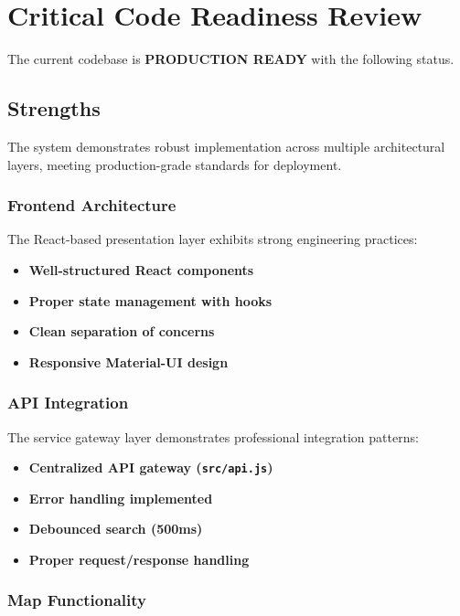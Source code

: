 \chapter{Critical Code Readiness Review}

The current codebase is \textbf{PRODUCTION READY} with the following status.

\section{Strengths}

The system demonstrates robust implementation across multiple architectural layers, meeting production-grade standards for deployment.

\subsection{Frontend Architecture}

The React-based presentation layer exhibits strong engineering practices:

\begin{itemize}
    \item \textbf{Well-structured React components} 
    \item \textbf{Proper state management with hooks} 
    \item \textbf{Clean separation of concerns} 
    \item \textbf{Responsive Material-UI design} 
\end{itemize}

\subsection{API Integration}

The service gateway layer demonstrates professional integration patterns:

\begin{itemize}
    \item \textbf{Centralized API gateway (\texttt{src/api.js})} 
    \item \textbf{Error handling implemented} 
    \item \textbf{Debounced search (500ms)} 
    \item \textbf{Proper request/response handling} 
\end{itemize}

\subsection{Map Functionality}


